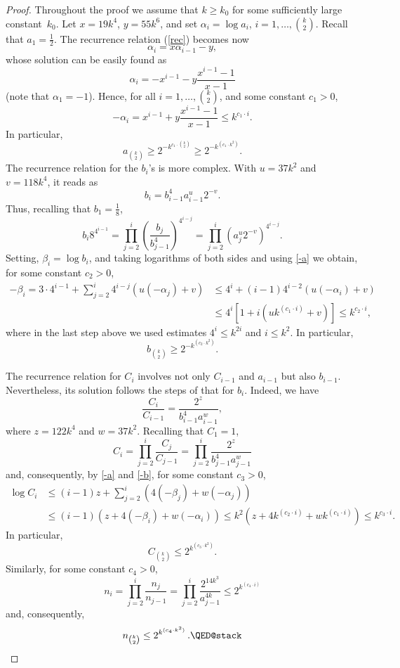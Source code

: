 \documentclass[reqno, 12pt]{amsart}
\begin{document}
\begin{proof}  Throughout the proof we assume that $k\ge k_0$ for some sufficiently large constant~$k_0$.
Let  $x=19k^4$, $y=55k^6$, and set $\alpha_i=\log a_i$, $i=1,\dots,\binom k2$. Recall that
$a_1=\tfrac12$. The recurrence relation (\ref{rec}) becomes now
$$\alpha_i=x\alpha_{i-1}-y,$$
whose solution can be easily found as
$$\alpha_i=-x^{i-1}-y\frac{x^{i-1}-1}{x-1}$$
(note that $\alpha_1=-1$). Hence, for all $i=1,\dots,\binom k2$, and some constant $c_1>0$,
\begin{equation}\label{-a}
-\alpha_i=x^{i-1}+y\frac{x^{i-1}-1}{x-1}\le k^{c_1\cdot i}.
\end{equation}
 In particular,
$$a_{\binom k2}\ge 2^{-k^{c_1\cdot \binom k2}}\ge 2^{-k^{(c_1\cdot
k^2)}}.$$
 The recurrence relation for the $b_i$'s is more complex. With
$u=37k^2$ and $v=118k^4$, it reads  as
$$b_i=b_{i-1}^4a_{i-1}^u2^{-v}.$$
Thus, recalling that $b_1=\tfrac18$,
$$b_i8^{4^{i-1}}=\prod_{j=2}^i\left(\frac{b_j}{b_{j-1}^4}\right)^{4^{i-j}}=\prod_{j=2}^i\left(
a_j^{u}2^{-v}\right)^{4^{i-j}}.$$ Setting, $\beta_i=\log b_i$, and taking logarithms of both sides
and using \eqref{-a} we obtain, for some constant $c_2>0$,
\begin{align}
-\beta_i=3\cdot4^{i-1}+\sum_{j=2}^i4^{i-j}\left(u(-\alpha_j)+v\right)
&\le4^i+(i-1)4^{i-2}\left(u(-\alpha_i)+v\right)\nonumber\\
&\le4^i\left[1+i\left(uk^{(c_1\cdot
i)}+v\right)\right]\le k^{c_2\cdot i},\label{-b}
\end{align}
 where in the last step above we used estimates $4^i\le k^{2i}$ and $i\le k^2$.
In particular,
$$b_{\binom k2}\ge 2^{-k^{(c_2\cdot k^2)}}.$$

The recurrence relation for $C_i$ involves not only $C_{i-1}$ and $a_{i-1}$ but also $b_{i-1}$.
Nevertheless, its solution follows the steps of that for $b_i$. Indeed, we have
$$\frac{C_i}{C_{i-1}}=\frac{2^z}{b_{i-1}^4a_{i-1}^w},$$
where $z=122k^4$ and $w=37k^2$. Recalling that $C_1=1$,
$$C_i=\prod_{j=2}^i\frac{C_j}{C_{j-1}}=\prod_{j=2}^i\frac{2^z}{b_{j-1}^4a_{j-1}^w}$$
and, consequently, by \eqref{-a} and \eqref{-b}, for some constant $c_3>0$,
\begin{align*}
	\log C_i
	&\le
	(i-1)z+\sum_{j=2}^i\left(4(-\beta_j)+w(-\alpha_j)\right)\\
	&\le
	(i-1)\left(z+4(-\beta_i)+w(-\alpha_i)\right)
	\le k^2\left(z+4k^{(c_2\cdot i)}+wk^{(c_1\cdot
i)}\right)
	\le 
	k^{c_3\cdot i}.
\end{align*}
In particular,
$$C_{\binom k2}\le 2^{k^{(c_3\cdot k^2)}}.$$
Similarly, for some constant $c_4>0$,
$$n_i=\prod_{j=2}^i\frac{n_j}{n_{j-1}}=\prod_{j=2}^i\frac{2^{14k^3}}{a_{j-1}^{4k}}\le 2^{k^{(c_4\cdot i)}}$$
and, consequently,
\[n_{\binom k2}\le 2^{k^{(c_4\cdot k^2)}}\,.\qedhere\]
\end{proof}
\end{document}
